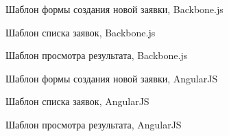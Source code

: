 
\lstset{
  language=HTML,
  basicstyle=\footnotesize\singlespace
}

\centerline{Шаблон формы создания новой заявки, Backbone.js}


\centerline{Шаблон списка заявок, Backbone.js}


\centerline{Шаблон просмотра результата, Backbone.js}


\centerline{Шаблон формы создания новой заявки, AngularJS}


\centerline{Шаблон списка заявок, AngularJS}


\centerline{Шаблон просмотра результата, AngularJS}


\lstset{
  language=JavaScript
}
